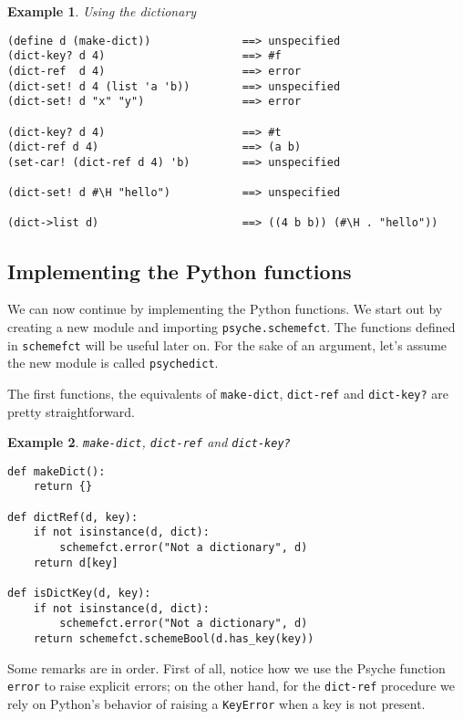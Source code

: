 \documentclass{report}
\newcommand{\code}[1]{\texttt{#1}}
\newcommand{\file}[1]{\texttt{#1}}
\newtheorem{exmp}{Example}[chapter]
\newenvironment{example}[1]
    {\begin{exmp} \textup{#1}
       \begin{small}}
    {  \end{small}
     \end{exmp}}
\begin{document}
\begin{example}{Using the dictionary}
\begin{verbatim}
(define d (make-dict))              ==> unspecified
(dict-key? d 4)                     ==> #f
(dict-ref  d 4)                     ==> error
(dict-set! d 4 (list 'a 'b))        ==> unspecified
(dict-set! d "x" "y")               ==> error

(dict-key? d 4)                     ==> #t
(dict-ref d 4)                      ==> (a b)
(set-car! (dict-ref d 4) 'b)        ==> unspecified

(dict-set! d #\H "hello")           ==> unspecified

(dict->list d)                      ==> ((4 b b)) (#\H . "hello"))
\end{verbatim}
\end{example}


\subsection{Implementing the Python functions}
We can now continue by implementing the Python functions. We start out
by creating a new module and importing \file{psyche.schemefct}. The
functions defined in \file{schemefct} will be useful later on. For the
sake of an argument, let's assume the new module is called
\file{psychedict}. 

The first functions, the equivalents of \code{make-dict},
\code{dict-ref} and \code{dict-key?} are pretty straightforward.

\begin{example}{\code{make-dict}, \code{dict-ref} and \code{dict-key?}}
\begin{verbatim}
def makeDict():
    return {}

def dictRef(d, key):
    if not isinstance(d, dict):
        schemefct.error("Not a dictionary", d)
    return d[key]

def isDictKey(d, key):
    if not isinstance(d, dict):
        schemefct.error("Not a dictionary", d)
    return schemefct.schemeBool(d.has_key(key))
\end{verbatim}
\end{example}

Some remarks are in order. First of all, notice how we use the Psyche
function \code{error} to raise explicit errors; on the other hand, for
the \code{dict-ref} procedure we rely on Python's behavior of raising
a \code{KeyError} when a key is not present.
\end{document}
